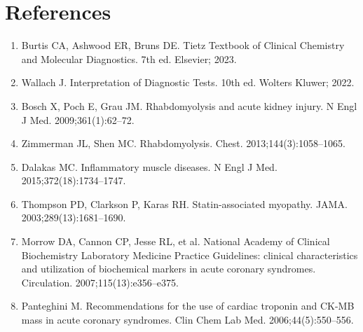 \section*{References}
\begin{enumerate}
  \item Burtis CA, Ashwood ER, Bruns DE. Tietz Textbook of Clinical Chemistry and Molecular Diagnostics. 7th ed. Elsevier; 2023.
  \item Wallach J. Interpretation of Diagnostic Tests. 10th ed. Wolters Kluwer; 2022.
  \item Bosch X, Poch E, Grau JM. Rhabdomyolysis and acute kidney injury. N Engl J Med. 2009;361(1):62--72.
  \item Zimmerman JL, Shen MC. Rhabdomyolysis. Chest. 2013;144(3):1058--1065.
  \item Dalakas MC. Inflammatory muscle diseases. N Engl J Med. 2015;372(18):1734--1747.
  \item Thompson PD, Clarkson P, Karas RH. Statin-associated myopathy. JAMA. 2003;289(13):1681--1690.
  \item Morrow DA, Cannon CP, Jesse RL, et al. National Academy of Clinical Biochemistry Laboratory Medicine Practice Guidelines: clinical characteristics and utilization of biochemical markers in acute coronary syndromes. Circulation. 2007;115(13):e356--e375.
  \item Panteghini M. Recommendations for the use of cardiac troponin and CK-MB mass in acute coronary syndromes. Clin Chem Lab Med. 2006;44(5):550--556.
\end{enumerate}

\clearpage
